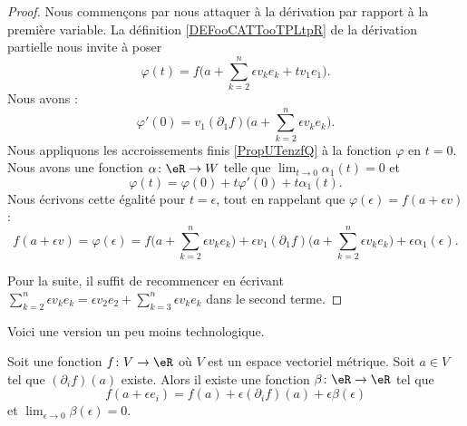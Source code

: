 \begin{proof}
	Nous commençons par nous attaquer à la dérivation par rapport à la première variable. La définition \ref{DEFooCATTooTPLtpR} de la dérivation partielle nous invite à poser
	\begin{equation}
		\varphi(t)=f\big( a+\sum_{k=2}^n\epsilon v_ke_k+tv_1e_1 \big).
	\end{equation}
	Nous avons :
	\begin{equation}
		\varphi'(0)=v_1(\partial_1f)\big( a+\sum_{k=2}^n\epsilon v_ke_k \big).
	\end{equation}
	Nous appliquons les accroissements finis \ref{PropUTenzfQ} à la fonction \( \varphi\) en \( t=0\). Nous avons une fonction \( \alpha\colon \eR\to W\) telle que \( \lim_{t\to 0} \alpha_1(t)=0\) et
	\begin{equation}
		\varphi(t)=\varphi(0)+t\varphi'(0)+t\alpha_1(t).
	\end{equation}
	Nous écrivons cette égalité pour \( t=\epsilon\), tout en rappelant que \( \varphi(\epsilon)=f(a+\epsilon v)\) :
	\begin{equation}
		f(a+\epsilon v) =  \varphi(\epsilon)=f\big( a+\sum_{k=2}^n\epsilon v_ke_k \big)+\epsilon v_1(\partial_1f)\big( a+\sum_{k=2}^n \epsilon v_ke_k \big)+\epsilon \alpha_1(\epsilon).
	\end{equation}

	Pour la suite, il suffit de recommencer en écrivant \( \sum_{k=2}^n \epsilon v_ke_k=\epsilon v_2 e_2+\sum_{k=3}^n\epsilon v_k e_k\) dans le second terme.
\end{proof}

Voici une version un peu moins technologique.
\begin{proposition}     \label{PROPooYYSMooUDxtlB}
	Soit une fonction \( f\colon V\to \eR\) où \( V\) est un espace vectoriel métrique. Soit \( a\in V\) tel que \( (\partial_if)(a)\) existe. Alors il existe une fonction \( \beta\colon \eR\to \eR\) tel que
	\begin{equation}
		f(a+\epsilon e_i)=f(a)+\epsilon(\partial_if)(a)+\epsilon\beta(\epsilon)
	\end{equation}
	et \( \lim_{\epsilon\to 0}\beta(\epsilon)=0\).
\end{proposition}


